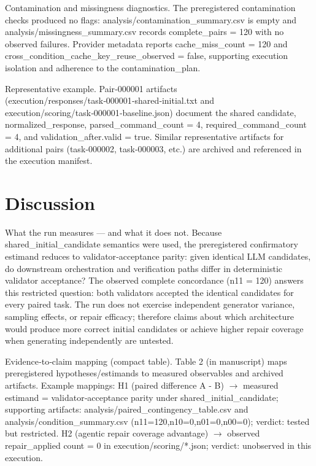 \documentclass[conference]{IEEEtran}
\begin{document}
Contamination and missingness diagnostics. The preregistered contamination checks produced no flags: analysis/contamination\_summary.csv is empty and analysis/missingness\_summary.csv records complete\_pairs = 120 with no observed failures. Provider metadata reports cache\_miss\_count = 120 and cross\_condition\_cache\_key\_reuse\_observed = false, supporting execution isolation and adherence to the contamination\_plan.

Representative example. Pair‑000001 artifacts (execution/responses/task‑000001‑shared‑initial.txt and execution/scoring/task‑000001‑baseline.json) document the shared candidate, normalized\_response, parsed\_command\_count = 4, required\_command\_count = 4, and validation\_after.valid = true. Similar representative artifacts for additional pairs (task‑000002, task‑000003, etc.) are archived and referenced in the execution manifest.

\section{Discussion}
What the run measures --- and what it does not. Because shared\_initial\_candidate semantics were used, the preregistered confirmatory estimand reduces to validator‑acceptance parity: given identical LLM candidates, do downstream orchestration and verification paths differ in deterministic validator acceptance? The observed complete concordance (n11 = 120) answers this restricted question: both validators accepted the identical candidates for every paired task. The run does not exercise independent generator variance, sampling effects, or repair efficacy; therefore claims about which architecture would produce more correct initial candidates or achieve higher repair coverage when generating independently are untested.

Evidence‑to‑claim mapping (compact table). Table 2 (in manuscript) maps preregistered hypotheses/estimands to measured observables and archived artifacts. Example mappings: H1 (paired difference A - B) \ensuremath{\rightarrow} measured estimand = validator‑acceptance parity under shared\_initial\_candidate; supporting artifacts: analysis/paired\_contingency\_table.csv and analysis/condition\_summary.csv (n11=120,n10=0,n01=0,n00=0); verdict: tested but restricted. H2 (agentic repair coverage advantage) \ensuremath{\rightarrow} observed repair\_applied count = 0 in execution/scoring/*.json; verdict: unobserved in this execution.
\end{document}
